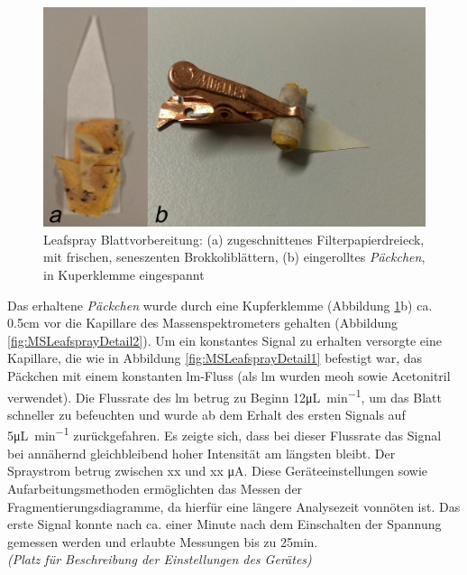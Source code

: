 \begin{figure}[hbtp]
  \centering
  \includegraphics[scale=0.5]{figures/Kapitel4/VWA_MSLeafspray_Blattvobereitung_zwei.png}
  \caption[MS-Leafspray Blattvorbereitung, Quelle: Autor]{Leafspray Blattvorbereitung: (a) zugeschnittenes Filterpapierdreieck, mit frischen, seneszenten Brokkoliblättern, (b) eingerolltes \textit{Päckchen}, in Kuperklemme eingespannt}
  \label{fig:LeafsprayVorbereitung}
\end{figure}

Das erhaltene \textit{Päckchen} wurde durch eine Kupferklemme (Abbildung \ref{fig:LeafsprayVorbereitung}b) ca. 0.5cm  vor die Kapillare des Massenspektrometers gehalten (Abbildung \ref{fig:MSLeafsprayDetail2}). Um ein konstantes Signal zu erhalten versorgte eine Kapillare, die wie in Abbildung \ref{fig:MSLeafsprayDetail1} befestigt war, das Päckchen mit einem konstanten \gls{lm}-Fluss (als \gls{lm} wurden \gls{meoh} sowie Acetonitril verwendet). Die Flussrate des \gls{lm} betrug zu Beginn 12\si{\uL\per\minute}, um das Blatt schneller zu befeuchten und wurde ab dem Erhalt des ersten Signals auf 5\si{\uL\per\minute} zurückgefahren. Es zeigte sich, dass bei dieser Flussrate das Signal bei annähernd gleichbleibend hoher Intensität am längsten bleibt. Der Spraystrom betrug zwischen xx und xx \si{\micro\ampere}. Diese Geräteeinstellungen sowie Aufarbeitungsmethoden ermöglichten das Messen der Fragmentierungsdiagramme, da hierfür eine längere Analysezeit vonnöten ist. Das erste Signal konnte nach ca. einer Minute nach dem Einschalten der Spannung gemessen werden und erlaubte Messungen bis zu 25min. \\

\textit{(Platz für Beschreibung der Einstellungen des Gerätes)}\\

